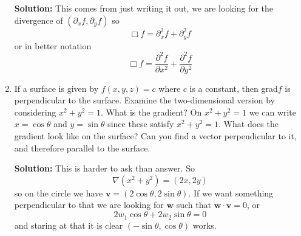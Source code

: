 \documentclass[12pt]{article}
\begin{document}
\begin{enumerate}
\textbf{Solution: } This comes from just writing it out, we are
looking for the divergence of $(\partial_x f,\partial_y f)$ so 
\begin{equation}
\Box f=\partial_x^2f+\partial_y^2f
\end{equation}
or in better notation
\begin{equation}
\Box f=\frac{\partial^2f}{\partial x^2}+\frac{\partial^2f}{\partial y^2}
\end{equation}

\item If a surface is given by $f(x,y,z)=c$ where $c$ is a constant,
  then grad$f$ is perpendicular to the surface. Examine the
  two-dimensional version by considering $x^2+y^2=1$. What is the
  gradient? On $x^2+y^2=1$ we can write $x=\cos{\theta}$ and
  $y=\sin{\theta}$ since these satisfy $x^2+y^2=1$. What does the
  gradient look like on the surface? Can you find a vector
  perpendicular to it, and therefore parallel to the surface.

\textbf{Solution: } This is harder to ask than answer. So 
\begin{equation}
\nabla(x^2+y^2)=(2x,2y)
\end{equation}
so on the circle we have $\mathbf{v}=(2\cos{\theta},2\sin{\theta})$. If we want something perpendicular to that we are looking for $\mathbf{w}$ such that $\mathbf{w}\cdot \mathbf{v}=0$, or
\begin{equation}
2w_1\cos{\theta}+2w_2\sin{\theta}=0
\end{equation}
and staring at that it is clear $(-\sin{\theta},\cos{\theta})$ works.


\end{enumerate}

 
\end{document}
